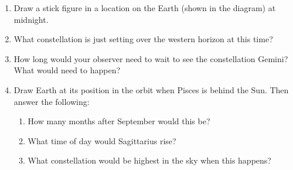 \documentclass[12pt]{article}
\begin{document}
\begin{enumerate}



	\item Draw a stick figure in a location on the Earth (shown in the diagram) at midnight.

\vspace{1in}
	
	\item What constellation is just setting over the western horizon at this time?
	\vspace{1in}
	
     \item How long would your observer need to wait to see the constellation Gemini? What would need to happen?
     \vspace{1in}
     

\item Draw Earth at its position in the orbit when Pisces is behind the Sun. Then answer the following:

\begin{enumerate}
	
	\item How many months after September would this be?
	
	\vspace{1in}
	
	
	\item What time of day would Sagittarius rise?
	
	\vspace{1in}
	
	\item What constellation would be highest in the sky when this happens?
\end{enumerate}

\end{enumerate}	
	
\end{document}
